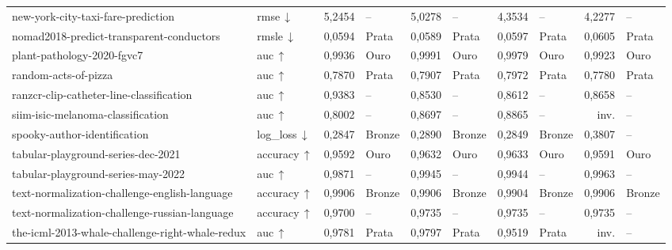 \begin{table}[!htbp]
{\begin{tabular}{@{}p{4.0cm}l rl rl rl rl@{}}
new-york-city-taxi-fare-prediction & rmse\,$\downarrow$ & 5,2454 & -- & 5,0278 & -- & 4,3534 & -- & 4,2277 & --\\
nomad2018-predict-transparent-conductors & rmsle\,$\downarrow$ & 0,0594 & Prata & 0,0589 & Prata & 0,0597 & Prata & 0,0605 & Prata\\
plant-pathology-2020-fgvc7 & auc\,$\uparrow$ & 0,9936 & Ouro & 0,9991 & Ouro & 0,9979 & Ouro & 0,9923 & Ouro\\
random-acts-of-pizza & auc\,$\uparrow$ & 0,7870 & Prata & 0,7907 & Prata & 0,7972 & Prata & 0,7780 & Prata\\
ranzcr-clip-catheter-line-classification & auc\,$\uparrow$ & 0,9383 & -- & 0,8530 & -- & 0,8612 & -- & 0,8658 & --\\
siim-isic-melanoma-classification & auc\,$\uparrow$ & 0,8002 & -- & 0,8697 & -- & 0,8865 & -- & inv. & --\\
spooky-author-identification & log\_loss\,$\downarrow$ & 0,2847 & Bronze & 0,2890 & Bronze & 0,2849 & Bronze & 0,3807 & --\\
tabular-playground-series-dec-2021 & accuracy\,$\uparrow$ & 0,9592 & Ouro & 0,9632 & Ouro & 0,9633 & Ouro & 0,9591 & Ouro\\
tabular-playground-series-may-2022 & auc\,$\uparrow$ & 0,9871 & -- & 0,9945 & -- & 0,9944 & -- & 0,9963 & --\\
text-normalization-challenge-english-language & accuracy\,$\uparrow$ & 0,9906 & Bronze & 0,9906 & Bronze & 0,9904 & Bronze & 0,9906 & Bronze\\
text-normalization-challenge-russian-language & accuracy\,$\uparrow$ & 0,9700 & -- & 0,9735 & -- & 0,9735 & -- & 0,9735 & --\\
the-icml-2013-whale-challenge-right-whale-redux & auc\,$\uparrow$ & 0,9781 & Prata & 0,9797 & Prata & 0,9519 & Prata & inv. & --\\
\bottomrule
\end{tabular}}
\end{table}
